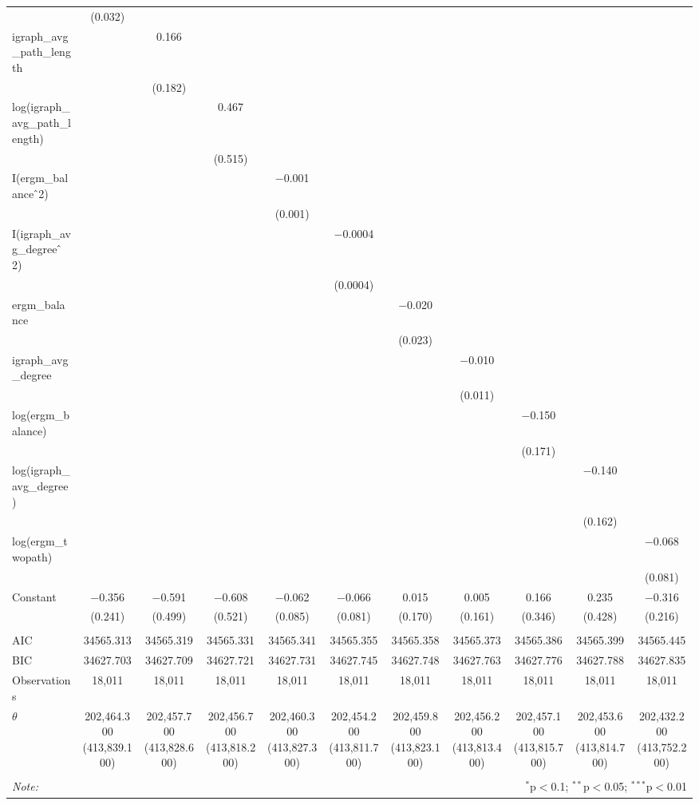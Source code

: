 \begin{table}[!htbp]
\begin{tabular}{@{\extracolsep{5pt}}lcccccccccc}
  & (0.032) &  &  &  &  &  &  &  &  &  \\ 
  igraph\_avg\_path\_length &  & 0.166 &  &  &  &  &  &  &  &  \\ 
  &  & (0.182) &  &  &  &  &  &  &  &  \\ 
  log(igraph\_avg\_path\_length) &  &  & 0.467 &  &  &  &  &  &  &  \\ 
  &  &  & (0.515) &  &  &  &  &  &  &  \\ 
  I(ergm\_balance$\hat{\mkern6mu}$2) &  &  &  & $-$0.001 &  &  &  &  &  &  \\ 
  &  &  &  & (0.001) &  &  &  &  &  &  \\ 
  I(igraph\_avg\_degree$\hat{\mkern6mu}$2) &  &  &  &  & $-$0.0004 &  &  &  &  &  \\ 
  &  &  &  &  & (0.0004) &  &  &  &  &  \\ 
  ergm\_balance &  &  &  &  &  & $-$0.020 &  &  &  &  \\ 
  &  &  &  &  &  & (0.023) &  &  &  &  \\ 
  igraph\_avg\_degree &  &  &  &  &  &  & $-$0.010 &  &  &  \\ 
  &  &  &  &  &  &  & (0.011) &  &  &  \\ 
  log(ergm\_balance) &  &  &  &  &  &  &  & $-$0.150 &  &  \\ 
  &  &  &  &  &  &  &  & (0.171) &  &  \\ 
  log(igraph\_avg\_degree) &  &  &  &  &  &  &  &  & $-$0.140 &  \\ 
  &  &  &  &  &  &  &  &  & (0.162) &  \\ 
  log(ergm\_twopath) &  &  &  &  &  &  &  &  &  & $-$0.068 \\ 
  &  &  &  &  &  &  &  &  &  & (0.081) \\ 
  Constant & $-$0.356 & $-$0.591 & $-$0.608 & $-$0.062 & $-$0.066 & 0.015 & 0.005 & 0.166 & 0.235 & $-$0.316 \\ 
  & (0.241) & (0.499) & (0.521) & (0.085) & (0.081) & (0.170) & (0.161) & (0.346) & (0.428) & (0.216) \\ 
 \hline \\[-1.8ex] 
AIC & 34565.313 & 34565.319 & 34565.331 & 34565.341 & 34565.355 & 34565.358 & 34565.373 & 34565.386 & 34565.399 & 34565.445 \\ 
BIC & 34627.703 & 34627.709 & 34627.721 & 34627.731 & 34627.745 & 34627.748 & 34627.763 & 34627.776 & 34627.788 & 34627.835 \\ 
Observations & 18,011 & 18,011 & 18,011 & 18,011 & 18,011 & 18,011 & 18,011 & 18,011 & 18,011 & 18,011 \\ 
$\theta$ & 202,464.300  (413,839.100) & 202,457.700  (413,828.600) & 202,456.700  (413,818.200) & 202,460.300  (413,827.300) & 202,454.200  (413,811.700) & 202,459.800  (413,823.100) & 202,456.200  (413,813.400) & 202,457.100  (413,815.700) & 202,453.600  (413,814.700) & 202,432.200  (413,752.200) \\ 
\hline 
\hline \\[-1.8ex] 
\textit{Note:}  & \multicolumn{10}{r}{$^{*}$p$<$0.1; $^{**}$p$<$0.05; $^{***}$p$<$0.01} \\ 
\end{tabular} 
\end{table} 
